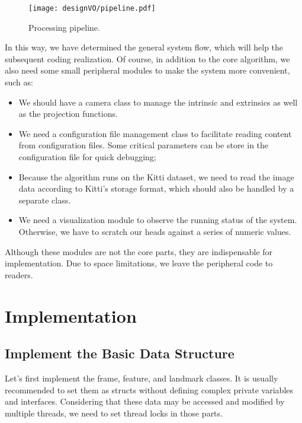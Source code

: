 \begin{figure}[!htp]
	\centering
	\texttt{[image: designVO/pipeline.pdf]}
	\caption{Processing pipeline.}
	\label{fig:pipeline}
\end{figure}

In this way, we have determined the general system flow, which will help the subsequent coding realization. Of course, in addition to the core algorithm, we also need some small peripheral modules to make the system more convenient, such as:
\begin{itemize}
	\item We should have a camera class to manage the intrinsic and extrinsics as well as the projection functions.
	\item We need a configuration file management class to facilitate reading content from configuration files. Some critical parameters can be store in the configuration file for quick debugging;
	\item Because the algorithm runs on the Kitti dataset, we need to read the image data according to Kitti's storage format, which should also be handled by a separate class.
	\item We need a visualization module to observe the running status of the system. Otherwise, we have to scratch our heads against a series of numeric values.
\end{itemize}

Although these modules are not the core parts, they are indispensable for implementation. Due to space limitations, we leave the peripheral code to readers.

\section{Implementation}
\subsection{Implement the Basic Data Structure}
Let's first implement the frame, feature, and landmark classes. It is usually recommended to set them as structs without defining complex private variables and interfaces. Considering that these data may be accessed and modified by multiple threads, we need to set thread locks in those parts.

